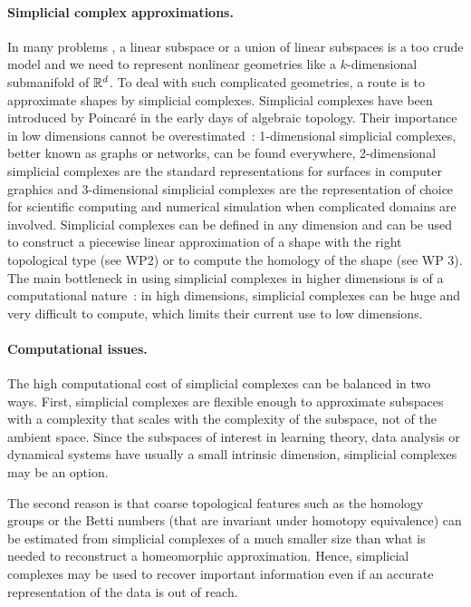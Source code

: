 \paragraph{Simplicial complex approximations.}
In many problems , a linear subspace or a union of linear subspaces is a too crude model and we need to represent nonlinear geometries like a $k$-dimensional submanifold of $\mathbb R^d$.  To deal with such complicated geometries, a route is to approximate shapes by simplicial complexes.  Simplicial complexes have been introduced by Poincar\'e in the early days of algebraic topology. Their importance in low dimensions cannot be overestimated~: 1-dimensional simplicial complexes, better known as graphs or networks, can be found everywhere, 2-dimensional simplicial complexes are the standard representations for surfaces in computer graphics and 3-dimensional simplicial complexes are the representation of choice for scientific computing and numerical simulation when complicated domains are involved. Simplicial complexes can be defined in any dimension and can be used to construct a piecewise linear approximation of a shape with the right topological type (see WP2) or to 
compute the homology of the shape (see WP 3). The main bottleneck in using simplicial complexes in higher dimensions is of a computational nature~:  in high dimensions, simplicial complexes can be huge and very difficult to compute, which limits their current use to low dimensions.

\paragraph{Computational issues.}
The high computational cost of simplicial complexes can be balanced in two ways. First, simplicial complexes are flexible enough to approximate subspaces with a complexity that scales with the complexity of the subspace, not of the ambient space. Since the subspaces of interest 
 in learning theory, data analysis or dynamical systems have usually a small intrinsic dimension,
simplicial complexes may be an option.

The second reason is that coarse topological features such as the homology groups or the Betti numbers (that are invariant under homotopy equivalence) can be estimated from simplicial complexes of a much smaller size than what is needed to reconstruct a homeomorphic approximation. Hence, simplicial complexes may be used to recover important information even if an accurate representation of the data is out of reach.

